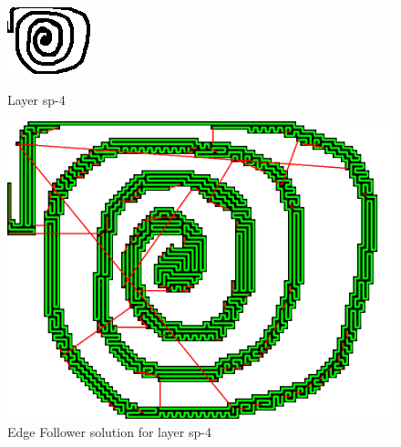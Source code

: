 \documentclass[titlepage]{article}
\newcommand{\multifigcaption}{\captionsetup{justification=justified}}
\begin{document}
\begin{figure}[H]
	\begin{center}
		\begin{minipage}{.45\linewidth}
			\includegraphics[width=\textwidth]{img/results/sp-4.png}
			\multifigcaption
			\caption{Layer sp-4 \newline}
			\label{img:results/sp-4}
		\end{minipage}
		\hspace{.05\linewidth}
		\begin{minipage}{.45\linewidth}
			\includegraphics[width=\textwidth]{img/results/sp-4-ef-energy.png}
			\multifigcaption
			\caption{Edge Follower solution for layer sp-4}
			\label{img:results/sp-4-ef-energy}
		\end{minipage}
	\end{center}
\end{figure}
\end{document}
